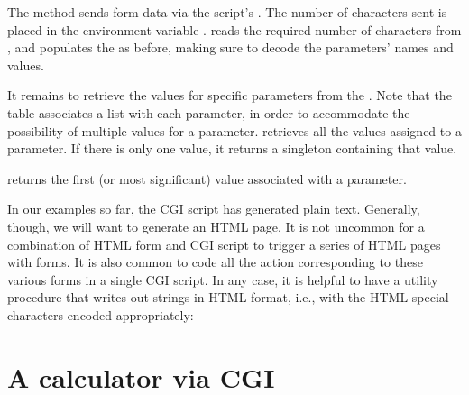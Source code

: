 {{{{{{{\n The  method sends form data via the script’s
.  The number of characters sent is placed in
the environment variable .
 reads the required
number of characters from , and populates the
 as before, making sure to decode
the parameters’ names and values.

It remains to retrieve the values for specific
parameters from the .  Note that
the table associates a list with each parameter, in
order to accommodate the possibility of multiple values
for a parameter.   retrieves all the
values assigned to a parameter.  If there is only one
value, it returns a singleton containing that value.


\n {} returns the first (or most
  significant) value associated with a parameter.


\n In our examples so far, the CGI script has generated
plain text.  Generally, though, we will want to
generate an HTML page.  It is not uncommon for a
combination of HTML form and CGI script to trigger a
series of HTML pages with forms.  It is also common to
code all the action corresponding to these various
forms in a single CGI script.  In any case, it is
helpful to have a utility procedure that writes out strings
in HTML format, i.e., with the HTML special characters
encoded appropriately:


\section{A calculator via CGI}

}}}}}}}
